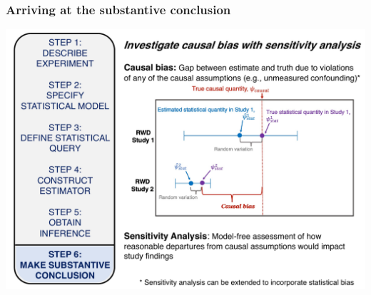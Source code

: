 \documentclass[t]{beamer}
\begin{document}




\begin{frame}
\frametitle{Arriving at the substantive conclusion}
\vspace{-16pt}
  \begin{center}
  \includegraphics[width = 1.02\textwidth]{figures/roadmap6.pdf}
  \end{center}
\end{frame}
\end{document}

